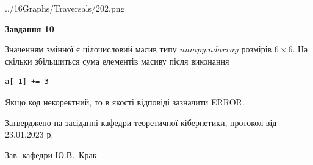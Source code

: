 \documentclass[12pt, ukrainian]{article}
\begin{document}
{\begin {large}
\begin{center}
	{../16Graphs/Traversals/202.png}
\end{center}\par
\newpage

{\begin {center}\textbf{Завдання 10}\end {center}}\par
Значенням змінної  є цілочисловий масив типу $numpy.ndarray$ розмірів $6{\times}6$. На скільки збільшиться сума елементів масиву  після виконання
\begin{verbatim}
a[-1] += 3
\end{verbatim}


Якщо код некоректний, то в якості відповіді зазначити ERROR.\par
\newpage


\end {large}
}
{\smallskip \begin {small} Затверджено на засіданні кафедри теоретичної кібернетики, протокол  від   23.01.2023 р.\par\smallskip\smallskip
{\parbox {6.5 cm}{Зав. кафедри \dotfill Ю.В.~Крак}} \end{small}}
\end{document}
